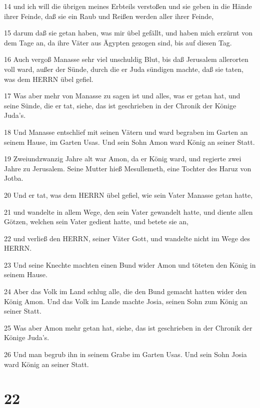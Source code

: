 \par 14 und ich will die übrigen meines Erbteils verstoßen und sie geben in die Hände ihrer Feinde, daß sie ein Raub und Reißen werden aller ihrer Feinde,
\par 15 darum daß sie getan haben, was mir übel gefällt, und haben mich erzürnt von dem Tage an, da ihre Väter aus Ägypten gezogen sind, bis auf diesen Tag.
\par 16 Auch vergoß Manasse sehr viel unschuldig Blut, bis daß Jerusalem allerorten voll ward, außer der Sünde, durch die er Juda sündigen machte, daß sie taten, was dem HERRN übel gefiel.
\par 17 Was aber mehr von Manasse zu sagen ist und alles, was er getan hat, und seine Sünde, die er tat, siehe, das ist geschrieben in der Chronik der Könige Juda's.
\par 18 Und Manasse entschlief mit seinen Vätern und ward begraben im Garten an seinem Hause, im Garten Usas. Und sein Sohn Amon ward König an seiner Statt.
\par 19 Zweiundzwanzig Jahre alt war Amon, da er König ward, und regierte zwei Jahre zu Jerusalem. Seine Mutter hieß Mesullemeth, eine Tochter des Haruz von Jotba.
\par 20 Und er tat, was dem HERRN übel gefiel, wie sein Vater Manasse getan hatte,
\par 21 und wandelte in allem Wege, den sein Vater gewandelt hatte, und diente allen Götzen, welchen sein Vater gedient hatte, und betete sie an,
\par 22 und verließ den HERRN, seiner Väter Gott, und wandelte nicht im Wege des HERRN.
\par 23 Und seine Knechte machten einen Bund wider Amon und töteten den König in seinem Hause.
\par 24 Aber das Volk im Land schlug alle, die den Bund gemacht hatten wider den König Amon. Und das Volk im Lande machte Josia, seinen Sohn zum König an seiner Statt.
\par 25 Was aber Amon mehr getan hat, siehe, das ist geschrieben in der Chronik der Könige Juda's.
\par 26 Und man begrub ihn in seinem Grabe im Garten Usas. Und sein Sohn Josia ward König an seiner Statt.

\chapter{22}

